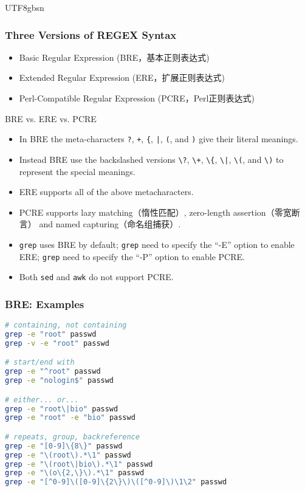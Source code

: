 \documentclass[red]{beamer}
\newcommand*{\lstverb}{\lstinline[style=caret]}
\begin{document}
\begin{CJK*}{UTF8}{gbsn}
\begin{frame}
\frametitle{Three Versions of REGEX Syntax}
\begin{itemize}
\footnotesize
	\item Basic Regular Expression (BRE，基本正则表达式)
	\item Extended Regular Expression (ERE，扩展正则表达式)
	\item Perl-Compatible Regular Expression (PCRE，Perl正则表达式) 
\end{itemize}
\begin{block}{\centering\footnotesize BRE vs. ERE vs. PCRE}
\scriptsize
\begin{itemize}
	\item In BRE the meta-characters \lstverb|?|, \lstverb|+|, \lstverb|{|, 
				\lstverb{|}, \lstverb|(|, and \lstverb|)| give their literal meanings.
	\item Instead BRE use the backslashed versions \lstverb|\?|, \lstverb|\+|, \lstverb|\{|,  
				\lstverb{\|},  \lstverb|\(|,  and \lstverb|\)| to represent the special meanings.
	\item ERE supports all of the above metacharacters.
	\item PCRE supports lazy matching（惰性匹配）, zero-length assertion（零宽断言） and named 
			capturing（命名组捕获）.
	\item \lstinline{grep} uses BRE by default; \lstinline{grep} need to specify the 
			``-E'' option to enable ERE; \lstinline{grep} need to specify the ``-P'' option 
			to enable PCRE.
	\item Both \lstinline{sed} and \lstinline{awk} do not support PCRE. 
\end{itemize}
\end{block}
\end{frame}


\begin{frame}[containsverbatim]
\frametitle{BRE: Examples}
\begin{lstlisting}[language=bash]
# containing, not containing
grep -e "root" passwd	 
grep -v -e "root" passwd

# start/end with
grep -e "^root" passwd
grep -e "nologin$" passwd

# either... or...
grep -e "root\|bio" passwd
grep -e "root" -e "bio" passwd

# repeats, group, backreference
grep -e "[0-9]\{8\}" passwd
grep -e "\(root\).*\1" passwd
grep -e "\(root\|bio\).*\1" passwd
grep -e "\(o\{2,\}\).*\1" passwd
grep -e "[^0-9]\([0-9]\{2\}\)\([^0-9]\)\1\2" passwd


\end{lstlisting}
\end{frame}
\end{CJK*}
\end{document}
